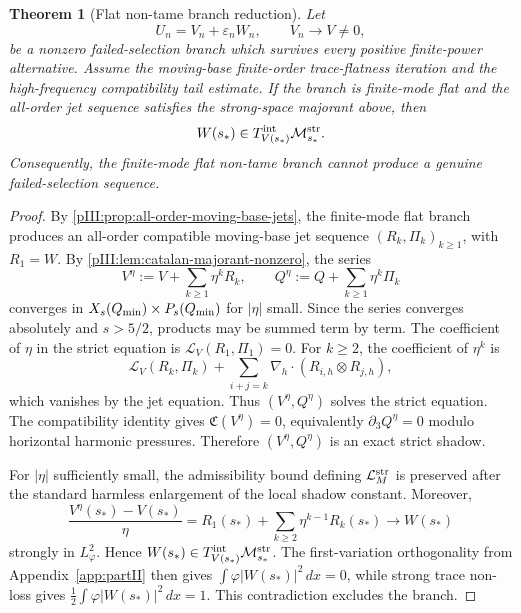 \documentclass[11pt]{article}
\numberwithin{equation}{section}
\theoremstyle{plain}
\newtheorem{theorem}{Theorem}[section]
\theoremstyle{definition}
\theoremstyle{remark}
\newcommand{\nabh}{\nabla_h}
\newcommand{\Mstr}{\mathcal M^{\rm str}}
\newcommand{\Lstr}{\mathcal L^{\rm str}}
\newcommand{\Tint}{T^{\rm int}}
\newcommand{\calC}{\mathfrak C}
\begin{document}
\begin{theorem}[Flat non-tame branch reduction]
\label{pIII:thm:flat-non-tame-branch-closure}
Let
\[
        U_n=V_n+\varepsilon_nW_n,
        \qquad
        V_n\to V\neq0,
\]
be a nonzero failed-selection branch which survives every positive finite-power alternative.  Assume
the moving-base finite-order trace-flatness iteration and the high-frequency compatibility tail
estimate.  If the branch is finite-mode flat and the all-order jet sequence satisfies the strong-space
majorant above, then
\[
        W(s_*)\in\Tint_{V(s_*)}\Mstr_{s_*}.
\]
Consequently, the finite-mode flat non-tame branch cannot produce a genuine failed-selection
sequence.
\end{theorem}

\begin{proof}
By \cref{pIII:prop:all-order-moving-base-jets}, the finite-mode flat branch produces an all-order
compatible moving-base jet sequence \((R_k,\Pi_k)_{k\ge1}\), with \(R_1=W\).  By
\cref{pIII:lem:catalan-majorant-nonzero}, the series
\[
        V^\eta:=V+\sum_{k\ge1}\eta^kR_k,
        \qquad
        Q^\eta:=Q+\sum_{k\ge1}\eta^k\Pi_k
\]
converges in \(X_s(Q_{\rm min})\times P_s(Q_{\rm min})\) for \(|\eta|\) small.  Since the series
converges absolutely and \(s>5/2\), products may be summed term by term.  The coefficient of
\(\eta\) in the strict equation is \(\mathscr L_V(R_1,\Pi_1)=0\).  For \(k\ge2\), the coefficient of
\(\eta^k\) is
\[
        \mathscr L_V(R_k,\Pi_k)+
        \sum_{i+j=k}\nabh\cdot(R_{i,h}\otimes R_{j,h}),
\]
which vanishes by the jet equation.  Thus \((V^\eta,Q^\eta)\) solves the strict equation.  The
compatibility identity gives \(\calC(V^\eta)=0\), equivalently \(\partial_3Q^\eta=0\) modulo
horizontal harmonic pressures.  Therefore \((V^\eta,Q^\eta)\) is an exact strict shadow.

For \(|\eta|\) sufficiently small, the admissibility bound defining \(\Lstr_M\) is preserved after the
standard harmless enlargement of the local shadow constant.  Moreover,
\[
        \frac{V^\eta(s_*)-V(s_*)}{\eta}
        =
        R_1(s_*)+
        \sum_{k\ge2}\eta^{k-1}R_k(s_*)
        \to
        W(s_*)
\]
strongly in \(L^2_\varphi\).  Hence \(W(s_*)\in\Tint_{V(s_*)}\Mstr_{s_*}\).  The first-variation
orthogonality from Appendix~\ref{app:partII} then gives \(\int\varphi|W(s_*)|^2\,dx=0\), while strong trace non-loss
gives \(\frac12\int\varphi|W(s_*)|^2\,dx=1\).  This contradiction excludes the branch.
\end{proof}
\end{document}
